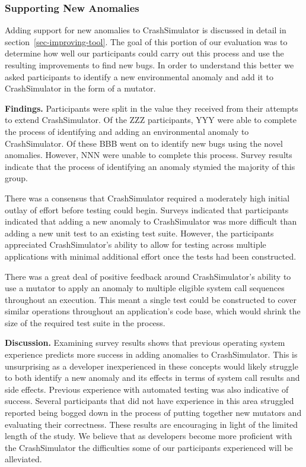 \subsubsection{Supporting New Anomalies}

Adding support for new anomalies to CrashSimulator is discussed in detail
in section~\ref{sec-improving-tool}.  The goal of this portion of our
evaluation was to determine how well our participants could carry out this
process and use the resulting improvements to find new bugs.  In order to
understand this better we asked
participants to identify a new environmental anomaly and add it to
CrashSimulator in the form of a mutator.

{\bf Findings. } Participants were split in
the value they received
from their attempts to extend
CrashSimulator.  Of the ZZZ participants, YYY were able to complete the
process of identifying and adding an environmental anomaly to
CrashSimulator.  Of these BBB went on to identify new bugs using the novel
anomalies.  However, NNN were unable to complete this process.  Survey
results indicate that the process of identifying an anomaly stymied the
majority of this group.

There was a consensus that
CrashSimulator required a
moderately high initial outlay of effort before testing could begin.
Surveys indicated that participants indicated that
adding a new anomaly to
CrashSimulator was more difficult than adding a new unit test to an
existing test suite.
However, the participants
appreciated
CrashSimulator's ability to allow for
testing
across multiple applications
with minimal additional effort once the tests had been constructed.

There was a great deal of
positive feedback around CrashSimulator's ability to use a mutator to apply
an anomaly to multiple eligible system call sequences throughout an
execution.  This meant a single test could be constructed to cover similar
operations throughout an application's code base, which would
shrink the size of the
required test suite in the process.

{\bf Discussion. } Examining survey results
shows that previous operating system experience predicts more success in
adding anomalies to CrashSimulator.  This is unsurprising as a developer
inexperienced in these concepts would likely struggle to both identify
a new anomaly and its effects in terms of system call results and side
effects.
Previous experience with automated testing was also indicative of success.
Several participants that did not have experience in this area struggled
reported being bogged down in the process of putting together new mutators
and evaluating their correctness.  These results are encouraging in light
of the limited length of the study.  We believe that as developers become
more proficient with the CrashSimulator the difficulties some of our
participants experienced will be alleviated.


